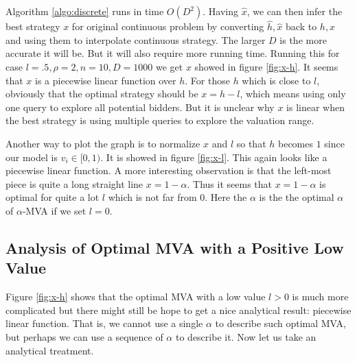Algorithm \ref{algo:discrete} runs in time $O(D^2)$. Having $\hat x$, we can
then infer the best strategy $x$ for original continuous problem by converting
$\hat h, \hat x$ back to $h, x$ and using them to interpolate continuous
strategy.  The larger $D$ is the more accurate it will be. But it will also
require more running time.  Running this for case $l = .5, \rho = 2, n = 10, D
= 1000$ we get $x$ showed in figure \ref{fig:x-h}. It seems that $x$ is a
piecewise linear function over $h$.  For those $h$ which is close to
$l$, obviously that the optimal strategy should be $x = h - l$,
which means using only one query to explore all potential bidders. But it is
unclear why $x$ is linear when the best strategy is using multiple queries to
explore the valuation range.

Another way to plot the graph is to normalize $x$ and $l$ so that $h$ becomes
$1$ since our model is $v_i \in [0, 1)$. It is showed in figure \ref{fig:x-l}.
This again looks like a piecewise linear function.  A more interesting
observation is that the left-most piece is quite a long straight line $x =
1-\alpha$. Thus it seems that $x = 1-\alpha$ is optimal for quite a lot $l$ which is not
far from $0$. Here the $\alpha$ is the the optimal $\alpha$ of $\alpha$-MVA if
we set $l = 0$.

\subsection{Analysis of Optimal MVA with a Positive Low Value}\label{sec:general_analysis}

Figure \ref{fig:x-h} shows that the optimal MVA with a low value $l > 0$ is
much more complicated but there might still be hope to get a nice analytical
result: piecewise linear function. That is, we cannot use a single $\alpha$ to
describe such optimal MVA, but perhaps we can use a sequence of $\alpha$ to
describe it. Now let us take an analytical treatment.


